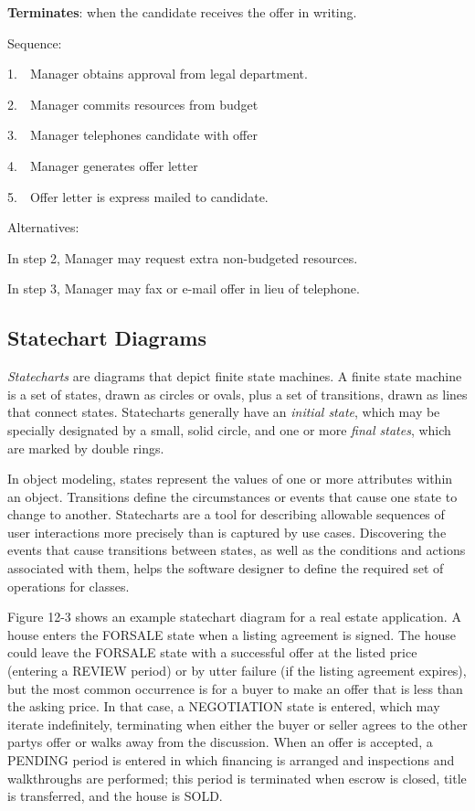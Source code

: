 \textbf{Terminates}: when the candidate receives the offer in writing.

Sequence:

1.\ \ Manager obtains approval from legal department.

2.\ \ Manager commits resources from budget

3.\ \ Manager telephones candidate with offer

4.\ \ Manager generates offer letter

5.\ \ Offer letter is express mailed to candidate.

Alternatives:

In step 2, Manager may request extra non-budgeted resources.

In step 3, Manager may fax or e-mail offer in lieu of telephone.

\subsection{Statechart Diagrams}
\textit{Statecharts} are diagrams that depict finite
state machines. A finite state machine is a
set of states, drawn as circles or ovals, plus a set of transitions,
drawn as lines that connect states. Statecharts generally have an
\textit{initial state}, which may be specially designated by a small,
solid circle, and one or more \textit{final states}, which are marked
by double rings.

In object modeling, states represent the values of one or more
attributes within an object. Transitions define the circumstances or
events that cause one state to change to another. Statecharts are a
tool for describing allowable sequences of user interactions more
precisely than is captured by use cases. Discovering the events that
cause transitions between states, as well as the conditions and actions
associated with them, helps the software designer to define the
required set of operations for classes.

Figure 12-3 shows an example statechart diagram for a real estate
application. A house enters the FORSALE state when a listing agreement
is signed. The house could leave the FORSALE state with a successful
offer at the listed price (entering a REVIEW period) or by utter
failure (if the listing agreement expires), but the most common
occurrence is for a buyer to make an offer that is less than the asking
price. In that case, a NEGOTIATION state is entered, which may iterate
indefinitely, terminating when either the buyer or seller agrees to the
other party{\textquotesingle}s offer or walks away from the discussion.
When an offer is accepted, a PENDING period is entered in which
financing is arranged and inspections and walkthroughs are performed;
this period is terminated when escrow is closed, title is transferred,
and the house is SOLD.


